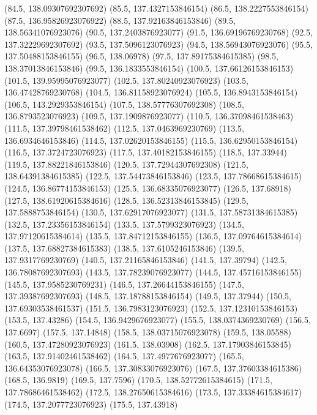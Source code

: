 {{{		(84.5, 138.09307692307692)
		(85.5, 137.4327153846154)
		(86.5, 138.2227553846154)
		(87.5, 136.95826923076922)
		(88.5, 137.92163846153846)
		(89.5, 138.56341076923076)
		(90.5, 137.2403876923077)
		(91.5, 136.69196769230768)
		(92.5, 137.32229692307692)
		(93.5, 137.5096123076923)
		(94.5, 138.56943076923076)
		(95.5, 137.50488153846155)
		(96.5, 138.06978)
		(97.5, 137.89175384615385)
		(98.5, 138.37013846153846)
		(99.5, 136.1833553846154)
		(100.5, 137.66126153846153)
		(101.5, 139.95995076923077)
		(102.5, 137.80240923076923)
		(103.5, 136.47428769230768)
		(104.5, 136.81158923076924)
		(105.5, 136.8943153846154)
		(106.5, 143.2929353846154)
		(107.5, 138.57776307692308)
		(108.5, 136.8793523076923)
		(109.5, 137.1909876923077)
		(110.5, 136.37098461538463)
		(111.5, 137.39798461538462)
		(112.5, 137.0463969230769)
		(113.5, 136.6934646153846)
		(114.5, 137.02620153846155)
		(115.5, 136.62950153846154)
		(116.5, 137.3724723076923)
		(117.5, 137.40182153846155)
		(118.5, 137.33944)
		(119.5, 137.88221846153846)
		(120.5, 137.72944307692308)
		(121.5, 138.64391384615385)
		(122.5, 137.54473846153846)
		(123.5, 137.78668615384615)
		(124.5, 136.86774153846153)
		(125.5, 136.68335076923077)
		(126.5, 137.68918)
		(127.5, 138.61920615384616)
		(128.5, 136.52313846153845)
		(129.5, 137.5888753846154)
		(130.5, 137.62917076923077)
		(131.5, 137.58731384615385)
		(132.5, 137.23356153846154)
		(133.5, 137.5799323076923)
		(134.5, 137.97120615384614)
		(135.5, 137.84712153846155)
		(136.5, 137.09764615384614)
		(137.5, 137.68827384615383)
		(138.5, 137.6105246153846)
		(139.5, 137.9317769230769)
		(140.5, 137.21165846153846)
		(141.5, 137.39794)
		(142.5, 136.78087692307693)
		(143.5, 137.78239076923077)
		(144.5, 137.45716153846155)
		(145.5, 137.9585230769231)
		(146.5, 137.26644153846155)
		(147.5, 137.39387692307693)
		(148.5, 137.18788153846154)
		(149.5, 137.37944)
		(150.5, 137.69303538461537)
		(151.5, 136.7983123076923)
		(152.5, 137.12310153846153)
		(153.5, 137.43286)
		(154.5, 136.9429676923077)
		(155.5, 138.0374369230769)
		(156.5, 137.6697)
		(157.5, 137.14848)
		(158.5, 138.03715076923078)
		(159.5, 138.05588)
		(160.5, 137.47280923076923)
		(161.5, 138.03908)
		(162.5, 137.17903846153845)
		(163.5, 137.91402461538462)
		(164.5, 137.4977676923077)
		(165.5, 136.64353076923078)
		(166.5, 137.30833076923076)
		(167.5, 137.37603384615386)
		(168.5, 136.9819)
		(169.5, 137.7596)
		(170.5, 138.52772615384615)
		(171.5, 137.78686461538462)
		(172.5, 138.27650615384616)
		(173.5, 137.33384615384617)
		(174.5, 137.2077723076923)
		(175.5, 137.43918)
}}}
